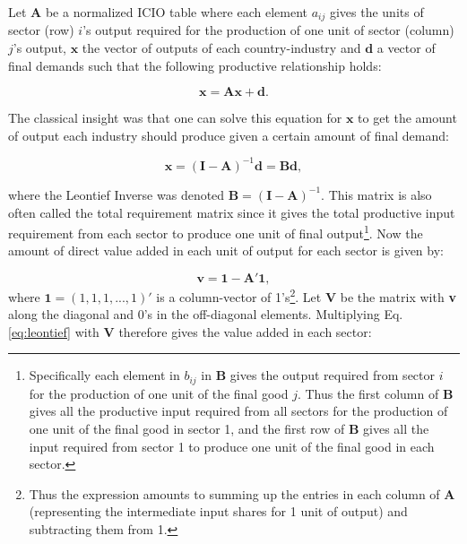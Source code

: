\documentclass[a4paper]{article}
\begin{document}
Let $\textbf{A}$ be a normalized ICIO table where each element $a_{ij}$ gives the units of sector (row) $i$'s output required for the production of one unit of sector (column) $j$'s output, $\textbf{x}$ the vector of outputs of each country-industry and $\textbf{d}$ a vector of final demands such that the following productive relationship holds:

\begin{equation}
\textbf{x} = \textbf{A}\textbf{x} + \textbf{d}.
\end{equation}

The classical \citet{leontief1936quantitative} insight was that one can solve this equation for $\textbf{x}$ to get the amount of output each industry should produce given a certain amount of final demand:

\begin{equation} \label{eq:leontief}
\textbf{x} = (\textbf{I}-\textbf{A})^{-1} \textbf{d} = \textbf{B}\textbf{d},
\end{equation}

where the Leontief Inverse was denoted $\textbf{B} = (\textbf{I}-\textbf{A})^{-1}$. This matrix is also often called the total requirement matrix since it gives the total productive input requirement from each sector to produce one unit of final output\footnote{Specifically each element in $b_{ij}$ in \textbf{B} gives the output required from sector $i$ for the production  of one unit of the final good $j$. Thus the first column of \textbf{B} gives all the productive input required from all sectors for the production of one unit of the final good in sector 1, and the first row of \textbf{B} gives all the input required from sector 1 to produce one unit of the final good in each sector.}. Now the amount of direct value added in each unit of output for each sector is given by:

\begin{equation}
\textbf{v} = \textbf{1} - \textbf{A}'\textbf{1},
\end{equation}
where $\textbf{1} = (1, 1, 1, ..., 1)'$ is a column-vector of 1's\footnote{Thus the expression amounts to summing up the entries in each column of \textbf{A} (representing the intermediate input shares for 1 unit of output) and subtracting them from 1.}. Let \textbf{V} be the matrix with \textbf{v} along the diagonal and 0's in the off-diagonal elements. Multiplying Eq. \ref{eq:leontief} with $\textbf{V}$ therefore gives the value added in each sector:
\end{document}
